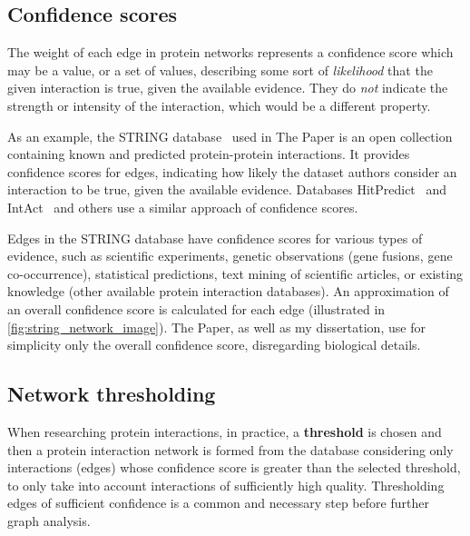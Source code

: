 

\subsection{Confidence scores}

The weight of each edge in protein networks represents a confidence score which may be a value, or a set of values, describing some sort of \textsl{likelihood} that the given interaction is true, given the available evidence.
They do \textsl{not} indicate the strength or intensity of the interaction, which would be a different property.

As an example, the STRING database~\cite{Szklarczyk2019} used in The Paper is an open collection containing known and predicted protein-protein interactions.
It provides confidence scores for edges, indicating how likely the dataset authors consider an interaction to be true, given the available evidence.
Databases HitPredict~\cite{LopezHitPredictVersionComprehensive2015} and IntAct~\cite{OrchardMIntActProjectIntAct2014} and others use a similar approach of confidence scores.



Edges in the STRING database have confidence scores for various types of evidence, such as scientific experiments, genetic observations (gene fusions, gene co-occurrence), statistical predictions, text mining of scientific articles, or existing knowledge (other available protein interaction databases).
An approximation of an overall confidence score is calculated for each edge (illustrated in \autoref{fig:string_network_image}).
The Paper, as well as my dissertation, use for simplicity only the overall confidence score, disregarding biological details.

\subsection{Network thresholding}

When researching protein interactions, in practice, a \textbf{threshold} is chosen and then a protein interaction network is formed from the database considering only interactions (edges) whose confidence score is greater than the selected threshold, to only take into account interactions of sufficiently high quality.
Thresholding edges of sufficient confidence is a common and necessary step before further graph analysis.

